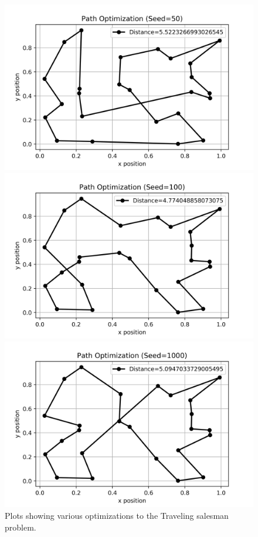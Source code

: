 \documentclass{article}
\begin{document}
\begin{figure}[H]
	\begin{minipage}{0.49\linewidth}
		\includegraphics[width=\linewidth]{../images/q3_s=50.png}
	\end{minipage}
	\begin{minipage}{0.49\linewidth}
		\includegraphics[width=\linewidth]{../images/q3_s=100.png}
	\end{minipage}
	\centering
	\begin{minipage}{0.49\linewidth}
		\includegraphics[width=\linewidth]{../images/q3_s=1000.png}
	\end{minipage}
	\caption{Plots showing various optimizations to the Traveling salesman problem.}
	\label{fig:q3_seeds}
\end{figure}
\end{document}
